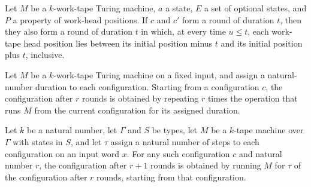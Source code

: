 \begin{theorem}
\label{Turing.Round.time_box}
\leanok
{}
Let $M$ be a $k$-work-tape Turing machine, $a$ a state, $E$ a set of optional states,
and $P$ a property of work-head positions. If $c$ and $c'$ form a round of duration $t$,
then they also form a round of duration $t$ in which, at every time $u\le t$, each
work-tape head position lies between its initial position minus $t$ and its initial
position plus $t$, inclusive.
\end{theorem}

\begin{definition}
\label{Turing.roundOrbit}
\leanok
{}
Let $M$ be a $k$-work-tape Turing machine on a fixed input, and assign a natural-number
duration to each configuration. Starting from a configuration $c$, the configuration
after $r$ rounds is obtained by repeating $r$ times the operation that runs $M$ from the
current configuration for its assigned duration.
\end{definition}

\begin{theorem}
\label{Turing.roundOrbit_succ}
\leanok
{}
Let $k$ be a natural number, let $\Gamma$ and $S$ be types, let $M$ be a $k$-tape
machine over $\Gamma$ with states in $S$, and let $\tau$ assign a natural number of
steps to each configuration on an input word $x$. For any such configuration $c$ and
natural number $r$, the configuration after $r+1$ rounds is obtained by running $M$ for
$\tau$ of the configuration after $r$ rounds, starting from that configuration.
\end{theorem}

